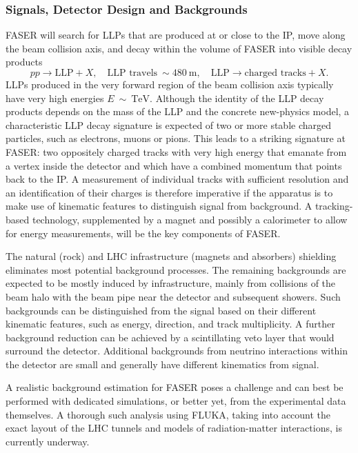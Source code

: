 
\subsubsection{Signals, Detector Design and Backgrounds}
\label{sec:FASERDetector}

FASER will search for LLPs that are produced at or close to the IP, move along the beam collision axis, and decay within the volume of FASER into visible decay products
\begin{equation}
  p p  \to \text{LLP} +X, \quad  \text{LLP travels} \ \sim 480~\text{m}, \quad \text{LLP} \to \text{charged tracks} + X .
\end{equation}
LLPs produced in the very forward region of the beam collision axis typically have very high energies $E~\sim~\text{TeV}$. Although the identity of the LLP decay products depends on the mass of the LLP and the concrete new-physics model, a characteristic LLP decay signature is expected of two or more stable charged particles, such as electrons, muons or pions. This leads to a striking signature at FASER: two oppositely charged tracks with very high energy that emanate from a vertex inside the detector and which have a combined momentum that points back to the IP. A measurement of individual tracks with sufficient resolution and an identification of their charges is therefore imperative if the apparatus is to make use of kinematic features to distinguish signal from background. A tracking-based technology, supplemented by a magnet and possibly a calorimeter to allow for  energy measurements, will be the key components of FASER. 

The natural (rock) and LHC infrastructure (magnets and absorbers) shielding eliminates most potential background processes. The remaining backgrounds are expected to be mostly induced by infrastructure, mainly from collisions of the beam halo with the beam pipe near the detector and subsequent showers. Such backgrounds can be distinguished from the signal based on their different kinematic features, such as energy, direction, and track multiplicity. A further background reduction can be achieved by a scintillating veto layer that would surround the detector. Additional backgrounds from neutrino interactions within the detector are small and generally have different kinematics from signal.

A realistic background estimation for FASER poses a challenge and can best be performed with dedicated simulations, or better yet, from the experimental data themselves. A thorough such analysis using FLUKA, taking into account the exact layout of the LHC tunnels and models of radiation-matter interactions, is currently underway. 

